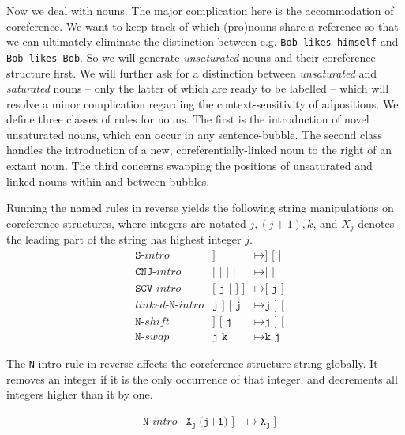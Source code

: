 Now we deal with nouns. The major complication here is the accommodation of coreference. We want to keep track of which (pro)nouns share a reference so that we can ultimately eliminate the distinction between e.g. \texttt{Bob likes himself} and \texttt{Bob likes Bob}. So we will generate \emph{unsaturated} nouns and their coreference structure first. We will further ask for a distinction between \emph{unsaturated} and \emph{saturated} nouns -- only the latter of which are ready to be labelled -- which will resolve a minor complication regarding the context-sensitivity of adpositions. We define three classes of rules for nouns. The first is the introduction of novel unsaturated nouns, which can occur in any sentence-bubble. The second class handles the introduction of a new, coreferentially-linked noun to the right of an extant noun. The third concerns swapping the positions of unsaturated and linked nouns within and between bubbles.

Running the named rules in reverse yields the following string manipulations on coreference structures, where integers are notated $j,(j+1),k$, and $X_j$ denotes the leading part of the string has highest integer $j$.
\begin{align}
&\texttt{S-}intro &\texttt{]} &\mapsto \texttt{] [ ]}\\
&\texttt{CNJ-}intro &\texttt{[ ] [ ]} &\mapsto \texttt{[ ]}\\
&\texttt{SCV-}intro &\texttt{[ j [ ] ]} &\mapsto \texttt{[ j ]}\\
&linked\texttt{-N-}intro &\texttt{j ] [ j} &\mapsto \texttt{j ] [}\\
&\texttt{N-}shift &\texttt{] [ j} &\mapsto \texttt{j ] [}\\
&\texttt{N-}swap &\texttt{j k} &\mapsto \texttt{k j}
\end{align}

The \texttt{N}-intro rule in reverse affects the coreference structure string globally. It removes an integer if it is the only occurrence of that integer, and decrements all integers higher than it by one.

\begin{align}
&\texttt{N-}intro &\texttt{X}_\texttt{j} \ \texttt{(j+1) ]} &\mapsto \texttt{X}_\texttt{j} \ \texttt{]}\\
\end{align}


